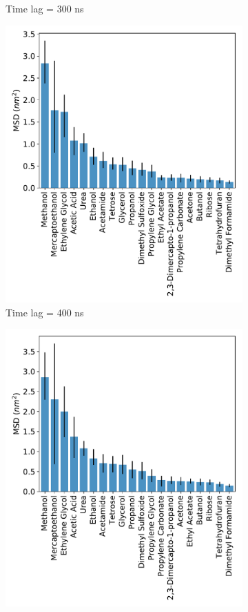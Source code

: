 \documentclass{article}
\begin{document}
\begin{figure}[!htb]
\begin{subfigure}{0.325\textwidth}
  \caption{Time lag = 300 ns}\label{fig:F0.3}
  \end{subfigure}
  \begin{subfigure}{0.325\textwidth}
  \includegraphics[width=\textwidth]{all_10wt_tamsds_F0_4.pdf}
  \caption{Time lag = 400 ns}\label{fig:F0.4}
  \end{subfigure}
  \begin{subfigure}{0.325\textwidth}
  \includegraphics[width=\textwidth]{all_10wt_tamsds_F0_5.pdf}

\end{subfigure}
\end{figure}
\end{document}

